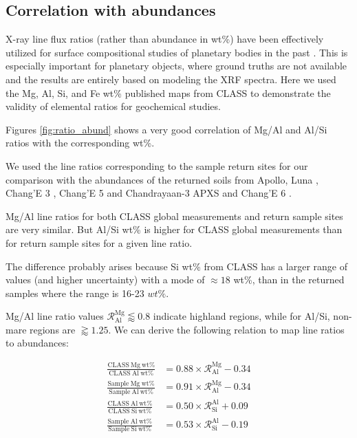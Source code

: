 \documentclass[twocolumn]{aastex631}
\begin{document}
\subsection{Correlation with abundances}\label{sec:corr_abund}
X-ray line flux ratios (rather than abundance in wt\%) have been effectively utilized for surface compositional studies of planetary bodies in the past \citep{2012JGRE..117.0L05W, Nittler2018}. 
This is especially important for planetary objects, where ground truths are not available and the results are entirely based on modeling the XRF spectra. Here we used the Mg, Al, Si, and Fe wt\% published maps from CLASS \citep{NARENDRANATH2024115898} to demonstrate the validity of elemental ratios for geochemical studies. 

Figures \ref{fig:ratio_abund} shows a very good correlation of Mg/Al and Al/Si ratios with the corresponding wt\%.

We used the line ratios corresponding to the sample return sites for our comparison with the abundances of the returned soils from Apollo, Luna \citep{meyer2005lunar}, Chang'E 3 \citep{Ng2023}, Chang'E 5 \citep{Zong2022} and Chandrayaan-3 APXS \citep{Vadawale2024} and Chang'E 6 \citep{10.1093/nsr/nwae328}. 

Mg/Al line ratios for both CLASS global measurements and return sample sites are very similar. But Al/Si wt\% is higher for CLASS global measurements than for return sample sites for a given line ratio. 
  
The difference probably arises because Si wt\% from CLASS has a larger range of values (and higher uncertainty) with a mode of $\approx 18 $ wt\%, than in the returned samples where the range is 16-23 $wt\%$.

Mg/Al line ratio values $\mathcal{R}^\text{Mg}_\text{Al} \lessapprox 0.8$ indicate highland regions, while for Al/Si, non-mare regions are $\gtrapprox 1.25$. 
We can derive the following relation to map line ratios to abundances:


\begin{align}
    \frac{\mathrm{CLASS~Mg~wt\%}}{\mathrm{CLASS~Al~wt\%}} &= 0.88 \times \mathcal{R}^\text{Mg}_\text{Al} - 0.34 \label{eq:mgal_class} \\
    \frac{\mathrm{Sample~Mg~wt\%}}{\mathrm{Sample~Al~wt\%}} &= 0.91 \times \mathcal{R}^\text{Mg}_\text{Al} - 0.34  \label{eq:mgal_sample} \\
    \frac{\mathrm{CLASS~Al~wt\%}}{\mathrm{CLASS~Si~wt\%}} &= 0.50 \times  \mathcal{R}^\text{Al}_\text{Si} + 0.09 \label{eq:alsi_class} \\
    \frac{\mathrm{Sample~Al~wt\%}}{\mathrm{Sample~Si~wt\%}} &= 0.53 \times  \mathcal{R}^\text{Al}_\text{Si} - 0.19 \label{eq:alsi_sample}
\end{align}
\end{document}
